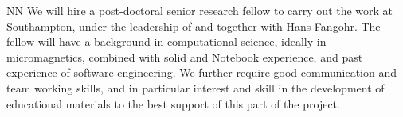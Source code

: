 \begin{participant}[type=R, PM=38]{NN}
  We will hire a post-doctoral senior research fellow to carry out the work
  at Southampton, under the leadership of and together with Hans
  Fangohr. The fellow will have a background in computational science,
  ideally in micromagnetics, combined with solid \IPython and
  \Jupyter{} Notebook experience, and past experience of software
  engineering. We further require good communication and team working
  skills, and in particular interest and skill in the development of
  educational materials to the best support of this part of the project.
\end{participant}